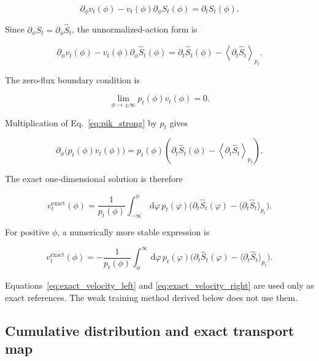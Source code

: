 \documentclass[reprint,twocolumn,superscriptaddress,preprintnumbers,amsmath,amssymb,aps,prd,floatfix]{revtex4-2}
\newcommand{\dd}{\,\mathrm{d}}
\begin{document}
\begin{equation}
 \partial_\phi v_t(\phi)
 -
 v_t(\phi)\partial_\phi S_t(\phi)
 =
 \partial_tS_t(\phi).
 \label{eq:pik_normalized}
\end{equation}

Since $\partial_\phi S_t=\partial_\phi\hat S_t$, the unnormalized-action form is

\begin{equation}
 \partial_\phi v_t(\phi)
 -
 v_t(\phi)\partial_\phi\hat S_t(\phi)
 =
 \partial_t\hat S_t(\phi)
 -
 \left\langle\partial_t\hat S_t\right\rangle_{p_t}.
 \label{eq:pik_strong}
\end{equation}

The zero-flux boundary condition is

\begin{equation}
 \lim_{\phi\to\pm\infty}
 p_t(\phi)v_t(\phi)
 =
 0.
 \label{eq:zero_flux}
\end{equation}

Multiplication of Eq.~\eqref{eq:pik_strong} by $p_t$ gives

\begin{equation}
 \partial_\phi\bigl(p_t(\phi)v_t(\phi)\bigr)
 =
 p_t(\phi)
 \left(
 \partial_t\hat S_t(\phi)
 -
 \left\langle\partial_t\hat S_t\right\rangle_{p_t}
 \right).
\end{equation}

The exact one-dimensional solution is therefore

\begin{equation}
 v_t^{\mathrm{exact}}(\phi)
 =
 \frac{1}{p_t(\phi)}
 \int_{-\infty}^{\phi}\dd\varphi\,
 p_t(\varphi)
 \bigl(
 \partial_t\hat S_t(\varphi)
 -
 \langle\partial_t\hat S_t\rangle_{p_t}
 \bigr).
 \label{eq:exact_velocity_left}
\end{equation}

For positive $\phi$, a numerically more stable expression is

\begin{equation}
 v_t^{\mathrm{exact}}(\phi)
 =
 -\frac{1}{p_t(\phi)}
 \int_{\phi}^{\infty}\dd\varphi\,
 p_t(\varphi)
 \bigl(
 \partial_t\hat S_t(\varphi)
 -
 \langle\partial_t\hat S_t\rangle_{p_t}
 \bigr).
 \label{eq:exact_velocity_right}
\end{equation}

Equations~\eqref{eq:exact_velocity_left} and \eqref{eq:exact_velocity_right} are used only as exact references. The weak training method derived below does not use them.

\subsection{Cumulative distribution and exact transport map}
\end{document}
